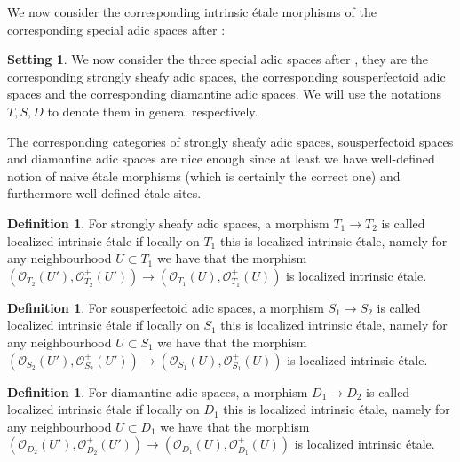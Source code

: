 \documentclass[12pt]{amsart}
\theoremstyle{definition}
\newtheorem{definition}[theorem]{Definition}
\numberwithin{equation}{section}
\newtheorem{setting}[theorem]{Setting}
\begin{document}

\indent We now consider the corresponding intrinsic \'etale morphisms of the corresponding special adic spaces after \cite{HK}: 


\begin{setting}
We now consider the three special adic spaces after \cite{HK}, they are the corresponding strongly sheafy adic spaces, the corresponding sousperfectoid adic spaces and the corresponding diamantine adic spaces. We will use the notations $T,S,D$ to denote them in general respectively.	
\end{setting}

\indent The corresponding categories of strongly sheafy adic spaces, sousperfectoid spaces and diamantine adic spaces are nice enough since at least we have well-defined notion of naive \'etale morphisms (which is certainly the correct one) and furthermore well-defined \'etale sites.




\begin{definition}
For strongly sheafy adic spaces, a morphism $T_1\rightarrow T_2$ is called localized intrinsic \'etale if locally on $T_1$ this is localized intrinsic \'etale, namely for any neighbourhood $U\subset T_1$ we have that the morphism $(\mathcal{O}_{T_2}(U'),\mathcal{O}^+_{T_2}(U'))\rightarrow (\mathcal{O}_{T_1}(U),\mathcal{O}^+_{T_1}(U))$ is localized intrinsic \'etale. 	
\end{definition}


\begin{definition}
For sousperfectoid adic spaces, a morphism $S_1\rightarrow S_2$ is called localized intrinsic \'etale if locally on $S_1$ this is localized intrinsic \'etale, namely for any neighbourhood $U\subset S_1$ we have that the morphism $(\mathcal{O}_{S_2}(U'),\mathcal{O}^+_{S_2}(U'))\rightarrow (\mathcal{O}_{S_1}(U),\mathcal{O}^+_{S_1}(U))$ is localized intrinsic \'etale. 	
\end{definition}

\begin{definition}
For diamantine adic spaces, a morphism $D_1\rightarrow D_2$ is called localized intrinsic \'etale if locally on $D_1$ this is localized intrinsic \'etale, namely for any neighbourhood $U\subset D_1$ we have that the morphism $(\mathcal{O}_{D_2}(U'),\mathcal{O}^+_{D_2}(U'))\rightarrow (\mathcal{O}_{D_1}(U),\mathcal{O}^+_{D_1}(U))$ is localized intrinsic \'etale. 	
\end{definition}
\end{document}
